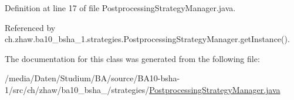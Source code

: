 Definition at line 17 of file PostprocessingStrategyManager.java.

Referenced by ch.zhaw.ba10\_\-bsha\_\-1.strategies.PostprocessingStrategyManager.getInstance().

The documentation for this class was generated from the following file:\begin{DoxyCompactItemize}
\item 
/media/Daten/Studium/BA/source/BA10-\/bsha-\/1/src/ch/zhaw/ba10\_\-bsha\_/strategies/\hyperlink{PostprocessingStrategyManager_8java}{PostprocessingStrategyManager.java}\end{DoxyCompactItemize}

